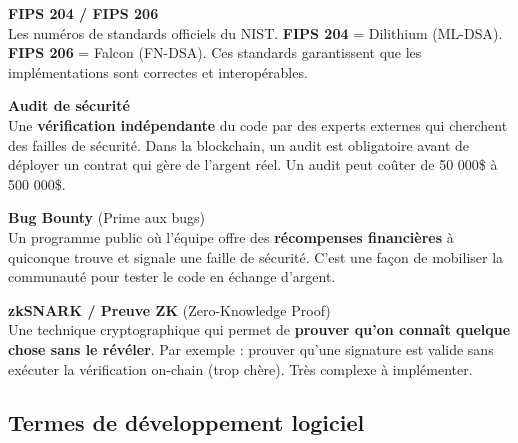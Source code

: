 \documentclass[12pt, a4paper]{article}
\begin{document}
\begin{tcolorbox}[colback=gray!4, colframe=gray!50, breakable]
\vspace{0.4cm}

\textbf{FIPS 204 / FIPS 206}\\
\hspace*{1em} Les numéros de standards officiels du NIST. \textbf{FIPS 204} = Dilithium (ML-DSA).
\textbf{FIPS 206} = Falcon (FN-DSA). Ces standards garantissent que les implémentations sont
correctes et interopérables.

\vspace{0.4cm}

\textbf{Audit de sécurité}\\
\hspace*{1em} Une \textbf{vérification indépendante} du code par des experts externes qui cherchent
des failles de sécurité. Dans la blockchain, un audit est obligatoire avant de déployer un contrat
qui gère de l'argent réel. Un audit peut coûter de 50 000\$ à 500 000\$.

\vspace{0.4cm}

\textbf{Bug Bounty} (Prime aux bugs)\\
\hspace*{1em} Un programme public où l'équipe offre des \textbf{récompenses financières} à
quiconque trouve et signale une faille de sécurité. C'est une façon de mobiliser la communauté
pour tester le code en échange d'argent.

\vspace{0.4cm}

\textbf{zkSNARK / Preuve ZK} (Zero-Knowledge Proof)\\
\hspace*{1em} Une technique cryptographique qui permet de \textbf{prouver qu'on connaît quelque
chose sans le révéler}. Par exemple : prouver qu'une signature est valide sans exécuter la
vérification on-chain (trop chère). Très complexe à implémenter.

\end{tcolorbox}

\vspace{0.4cm}

\subsection{Termes de développement logiciel}
\end{document}

